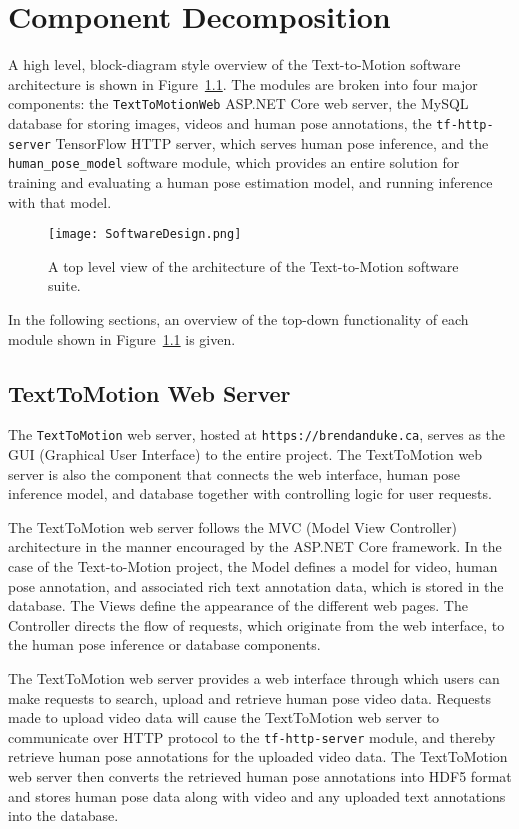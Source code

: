 \documentclass{scrreprt}
\begin{document}
\chapter{Component Decomposition}

A high level, block-diagram style overview of the Text-to-Motion software
architecture is shown in Figure~\ref{texttomotion_toplevel}. The modules are
broken into four major components: the \verb|TextToMotionWeb| ASP.NET Core web
server, the MySQL database for storing images, videos and human pose
annotations, the \verb|tf-http-server| TensorFlow HTTP server, which serves
human pose inference, and the \verb|human_pose_model| software module, which
provides an entire solution for training and evaluating a human pose estimation
model, and running inference with that model.

\begin{figure}[!ht]
        \centering
        \caption{A top level view of the architecture of the Text-to-Motion
                 software suite.}
        \texttt{[image: SoftwareDesign.png]}
        \label{texttomotion_toplevel}
\end{figure}

In the following sections, an overview of the top-down functionality of each
module shown in Figure~\ref{texttomotion_toplevel} is given.

\section{TextToMotion Web Server}

The \verb|TextToMotion| web server, hosted at \verb|https://brendanduke.ca|,
serves as the GUI (Graphical User Interface) to the entire project. The
TextToMotion web server is also the component that connects the web interface,
human pose inference model, and database together with controlling logic for
user requests.

The TextToMotion web server follows the MVC (Model View Controller)
architecture in the manner encouraged by the ASP.NET Core framework. In the
case of the Text-to-Motion project, the Model defines a model for video, human
pose annotation, and associated rich text annotation data, which is stored in
the database. The Views define the appearance of the different web pages. The
Controller directs the flow of requests, which originate from the web
interface, to the human pose inference or database components.

The TextToMotion web server provides a web interface through which users can
make requests to search, upload and retrieve human pose video data. Requests
made to upload video data will cause the TextToMotion web server to communicate
over HTTP protocol to the \verb|tf-http-server| module, and thereby retrieve
human pose annotations for the uploaded video data. The TextToMotion web server
then converts the retrieved human pose annotations into HDF5 format and stores
human pose data along with video and any uploaded text annotations into the
database.
\end{document}
